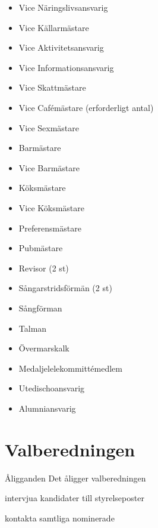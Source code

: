 \documentclass[pdfbookmarks,a4paper,11pt]{article}
\newlength{\itemcollength}
\newenvironment{reglemlista}{%
  \begin{list}{}{%
      \setlength{\labelwidth}{\itemcollength}%
      \setlength{\leftmargin}{\labelwidth + \labelsep}%
      \renewcommand{\makelabel}[1]{%
        \raisebox{0pt}[1ex][0pt]{%
          \makebox[\labelwidth][l]{%
            \parbox[t]{\itemcollength}{%
              \raggedright\hspace{0pt}##1}}}\hfill}%
      }}{%
  \end{list}}
\begin{document}
\begin{reglemlista}
\begin{itemize}
      \item Vice Näringslivsansvarig
      \item Vice Källarmästare
      \item Vice Aktivitetsansvarig
      \item Vice Informationsansvarig
      \item Vice Skattmästare
      \item Vice Cafémästare (erforderligt antal)
      \item Vice Sexmästare
      \item Barmästare
      \item Vice Barmästare
      \item Köksmästare
      \item Vice Köksmästare
      \item Preferensmästare

      \item Pubmästare
      \item Revisor (2 st)
      \item Sångarstridsförmän (2 st)
      \item Sångförman
      \item Talman
      \item Övermarskalk
      \item Medaljelelekommittémedlem
      \item Utedischoansvarig
      \item Alumniansvarig
      
 
    \end{itemize}

\end{reglemlista}

\section{Valberedningen}

\begin{reglemlista}

  \item[Åligganden]
    Det åligger valberedningen
    \begin{attlista}
      \item intervjua kandidater till styrelseposter
      \item kontakta samtliga nominerade
    \end{attlista}

\end{reglemlista}
\end{document}
